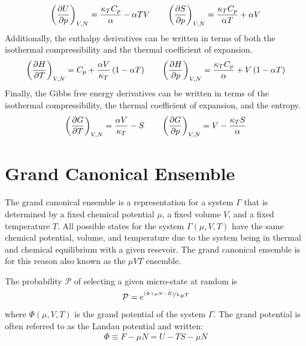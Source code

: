\begin{align}
    \left( \pdv{U}{p} \right )_{V,N} = \frac{\kappa_T C_p}{\alpha} - \alpha TV \quad\quad
    \left( \pdv{S}{p} \right )_{V,N} = \frac{\kappa_T C_p}{\alpha T} + \alpha V
\end{align}
Additionally, the enthalpy derivatives can be written in terms of both the isothermal compressibility and the thermal coefficient of expansion.
\begin{align}
    \left( \pdv{H}{T} \right )_{V,N} = C_p + \frac{\alpha V}{\kappa_T}\left(1-\alpha T\right) \quad\quad
    \left( \pdv{H}{p} \right )_{V,N} = \frac{\kappa_T C_p}{\alpha} + V\left(1-\alpha T\right)
\end{align}
Finally, the Gibbs free energy derivatives can be written in terms of the isothermal compressibility, the thermal coefficient of expansion, and the entropy.
\begin{align}
    \left( \pdv{G}{T} \right )_{V,N} = \frac{\alpha V}{\kappa_T}-S \quad\quad
    \left( \pdv{G}{p} \right )_{V,N} = V-\frac{\kappa_T S}{\alpha}
\end{align}

\section{Grand Canonical Ensemble}
The grand canonical ensemble is a representation for a system $\Gamma$ that is determined by a fixed chemical potential $\mu$, a fixed volume $V$, and a fixed temperature $T$. All possible states for the system $\Gamma\left(\mu,V,T\right)$ have the same chemical potential, volume, and temperature due to the system being in thermal and chemical equilibrium with a given resevoir.
The grand canonical ensemble is for this reason also known as the $\mu VT$ ensemble.

The probability $\mathcal{P}$ of selecting a given micro-state at random is
\begin{align}
    \mathcal{P} = e^{\nicefrac{\left(\Phi + \mu N-E\right)}{k_BT}}
\end{align}
where $\Phi\left(\mu,V,T\right)$ is the grand potential of the system $\Gamma$. The grand potential is often referred to as the Landau potential and written:
\begin{align}
    \Phi \equiv F -\mu N = U - TS -\mu N
\end{align}


